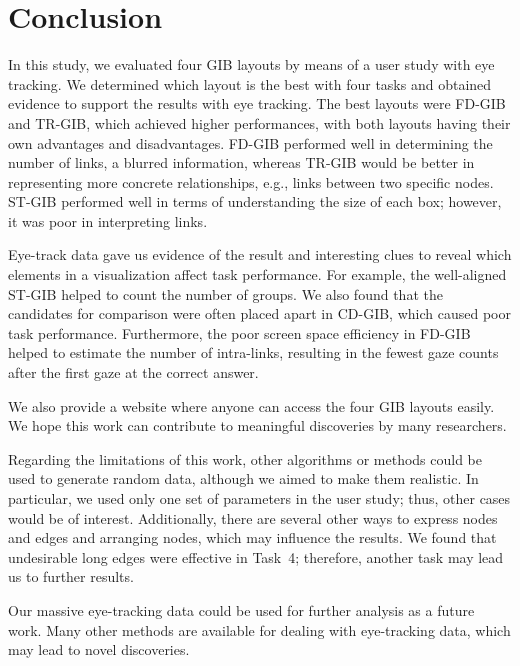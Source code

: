 \documentclass[review]{vgtc}                 %
\begin{document}
%
\section{Conclusion}
%

In this study, we evaluated four GIB layouts by means of a user study with eye tracking.
We determined which layout is the best with four tasks and obtained evidence to support the results with eye tracking.
The best layouts were FD-GIB and TR-GIB, which achieved higher performances, with both layouts having their own advantages and disadvantages.
FD-GIB performed well in determining the number of links, a blurred information, whereas TR-GIB would be better in representing more concrete relationships, e.g., links between two specific nodes.
ST-GIB performed well in terms of understanding the size of each box; however, it was poor in interpreting links.

Eye-track data gave us evidence of the result and interesting clues to reveal which elements in a visualization affect task performance.
For example, the well-aligned ST-GIB helped to count the number of groups.
We also found that the candidates for comparison were often placed apart in CD-GIB, which caused poor task performance.
Furthermore, the poor screen space efficiency in FD-GIB helped to estimate the number of intra-links, resulting in the fewest gaze counts after the first gaze at the correct answer.

We also provide a website where anyone can access the four GIB layouts easily.
We hope this work can contribute to meaningful discoveries by many researchers.

Regarding the limitations of this work, other algorithms or methods could be used to generate random data, although we aimed to make them realistic.
In particular, we used only one set of parameters in the user study; thus, other cases would be of interest.
Additionally, there are several other ways to express nodes and edges and arranging nodes, which may influence the results.
We found that undesirable long edges were effective in Task~4; therefore, another task may lead us to further results.

Our massive eye-tracking data could be used for further analysis as a future work.
Many other methods are available for dealing with eye-tracking data, which may lead to novel discoveries.



%

%
%
%


\end{document}
